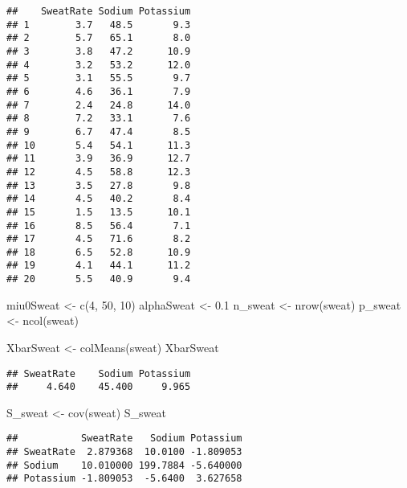 \documentclass[
]{article}
\newenvironment{Shaded}{\begin{snugshade}}{\end{snugshade}}
\newcommand{\DecValTok}[1]{\textcolor[rgb]{0.00,0.00,0.81}{#1}}
\newcommand{\FloatTok}[1]{\textcolor[rgb]{0.00,0.00,0.81}{#1}}
\newcommand{\FunctionTok}[1]{\textcolor[rgb]{0.00,0.00,0.00}{#1}}
\newcommand{\NormalTok}[1]{#1}
\newcommand{\OtherTok}[1]{\textcolor[rgb]{0.56,0.35,0.01}{#1}}
\begin{document}
\begin{verbatim}
##    SweatRate Sodium Potassium
## 1        3.7   48.5       9.3
## 2        5.7   65.1       8.0
## 3        3.8   47.2      10.9
## 4        3.2   53.2      12.0
## 5        3.1   55.5       9.7
## 6        4.6   36.1       7.9
## 7        2.4   24.8      14.0
## 8        7.2   33.1       7.6
## 9        6.7   47.4       8.5
## 10       5.4   54.1      11.3
## 11       3.9   36.9      12.7
## 12       4.5   58.8      12.3
## 13       3.5   27.8       9.8
## 14       4.5   40.2       8.4
## 15       1.5   13.5      10.1
## 16       8.5   56.4       7.1
## 17       4.5   71.6       8.2
## 18       6.5   52.8      10.9
## 19       4.1   44.1      11.2
## 20       5.5   40.9       9.4
\end{verbatim}

\begin{Shaded}
\begin{Highlighting}[]
\NormalTok{miu0Sweat }\OtherTok{\textless{}{-}} \FunctionTok{c}\NormalTok{(}\DecValTok{4}\NormalTok{, }\DecValTok{50}\NormalTok{, }\DecValTok{10}\NormalTok{)}
\NormalTok{alphaSweat }\OtherTok{\textless{}{-}} \FloatTok{0.1}
\NormalTok{n\_sweat }\OtherTok{\textless{}{-}} \FunctionTok{nrow}\NormalTok{(sweat)}
\NormalTok{p\_sweat }\OtherTok{\textless{}{-}} \FunctionTok{ncol}\NormalTok{(sweat)}
\end{Highlighting}
\end{Shaded}

\begin{Shaded}
\begin{Highlighting}[]
\NormalTok{XbarSweat }\OtherTok{\textless{}{-}} \FunctionTok{colMeans}\NormalTok{(sweat)}
\NormalTok{XbarSweat}
\end{Highlighting}
\end{Shaded}

\begin{verbatim}
## SweatRate    Sodium Potassium 
##     4.640    45.400     9.965
\end{verbatim}

\begin{Shaded}
\begin{Highlighting}[]
\NormalTok{S\_sweat }\OtherTok{\textless{}{-}} \FunctionTok{cov}\NormalTok{(sweat)}
\NormalTok{S\_sweat}
\end{Highlighting}
\end{Shaded}

\begin{verbatim}
##           SweatRate   Sodium Potassium
## SweatRate  2.879368  10.0100 -1.809053
## Sodium    10.010000 199.7884 -5.640000
## Potassium -1.809053  -5.6400  3.627658
\end{verbatim}
\end{document}
